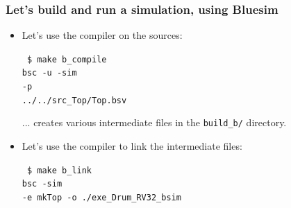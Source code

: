 \begin{frame}[fragile]
\frametitle{Let's build and run a {\DRUM} simulation, using Bluesim}

\begin{center}\scriptsize


 \vspace*{2ex}

 \begin{minipage}{0.8\textwidth}
  \begin{itemize}

   \item Let's use the {\bsc} compiler on the {\BSV} sources:

   \hmm\begin{minipage}{0.8\textwidth}\tiny
     \begin{tabbing}\tt
       \$ make b\_compile \\
       bsc -u -sim  \\
       \hmm -p    \\
       \hmm ../../src\_Top/Top.bsv
     \end{tabbing}
   \end{minipage}

   \vspace*{1ex}

   ... creates various intermediate files in the {\tt build\_b/} directory.

   \item Let's use the {\bsc} compiler to link the intermediate files:

   \hmm\begin{minipage}{0.8\textwidth}\tiny
     \begin{tabbing}\tt
       \$ make b\_link \\
       bsc  -sim  \\
       \hmm -e mkTop -o ./exe\_Drum\_RV32\_bsim \\
       \hmm  {} \\
     \end{tabbing}
   \end{minipage}


\end{itemize}
\end{minipage}
\end{center}
\end{frame}
